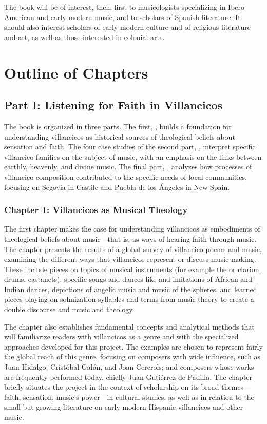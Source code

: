 \documentclass{vcbook-proposal}
\begin{document}
The book will be of interest, then, first to musicologists specializing in Ibero-American and early modern music, and to scholars of Spanish literature.
It should also interest scholars of early modern culture and of religious literature and art, as well as those interested in colonial arts.


\section{Outline of Chapters}

\subsection{Part I: Listening for Faith in Villancicos}

The book is organized in three parts.
The first, , builds a foundation for understanding villancicos as historical sources of theological beliefs about sensation and faith.
The four case studies of the second part, , interpret specific villancico families on the subject of music, with an emphasis on the links between earthly, heavenly, and divine music.
The final part, , analyzes how processes of villancico composition contributed to the specific needs of local communities, focusing on Segovia in Castile and Puebla de los Ángeles in New Spain.

\subsubsection{Chapter 1: Villancicos as Musical Theology}

The first chapter makes the case for understanding villancicos as embodiments of theological beliefs about music---that is, as ways of hearing faith through music.
The chapter presents the results of a global survey of villancico poems and music, examining the different ways that villancicos represent or discuss music-making.
These include pieces on topics of musical instruments (for example the  or clarion, drums, castanets), specific songs and dances like  and imitations of African and Indian dances, depictions of angelic music and music of the spheres, and learned pieces playing on solmization syllables and terms from music theory to create a double discourse and music and theology.

The chapter also establishes fundamental concepts and analytical methods that will familiarize readers with villancicos as a genre and with the specialized approaches developed for this project.
The examples are chosen to represent fairly the global reach of this genre, focusing on composers with wide influence, such as Juan Hidalgo, Cristóbal Galán, and Joan Cererols; and composers whose works are frequently performed today, chiefly Juan Gutiérrez de Padilla.
The chapter briefly situates the project in the context of scholarship on its broad themes---faith, sensation, music's power---in cultural studies, as well as in relation to the small but growing literature on early modern Hispanic villancicos and other music.
\end{document}
